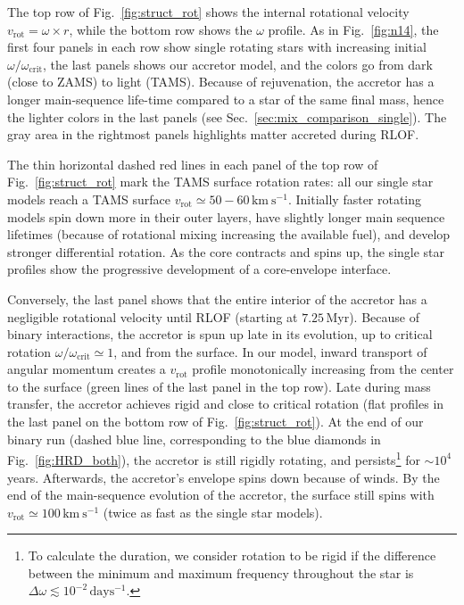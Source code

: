 \documentclass[twocolumn,twocolappendix,trackchanges]{aastex63}
\newcommand{\kms}{{\mathrm{km\ s^{-1}}}}
\DeclareRobustCommand{\Figref}[1]{Fig.~\ref{#1}}
\DeclareRobustCommand{\Secref}[1]{Sec.~\ref{#1}}
\begin{document}
The top row of \Figref{fig:struct_rot} shows the internal rotational
velocity $v_\mathrm{rot}=\omega\times r$, while the bottom row shows
the $\omega$ profile. As in \Figref{fig:n14}, the first four panels in
each row show single rotating stars with increasing initial
$\omega/\omega_\mathrm{crit}$, the last panels shows our accretor
model, and the colors go from dark (close to ZAMS) to light
(TAMS). Because of rejuvenation, the accretor has a longer
main-sequence life-time compared to a star of the same final mass,
hence the lighter colors in the last panels (see
\Secref{sec:mix_comparison_single}). The gray area in the rightmost
panels highlights matter accreted during RLOF.

The thin horizontal dashed red lines in each panel of the top row of
\Figref{fig:struct_rot} mark the TAMS surface rotation rates: all our
single star models reach a TAMS surface
$v_\mathrm{rot}\simeq50-60\,\kms$. Initially faster rotating models
spin down more in their outer layers, have slightly longer main
sequence lifetimes (because of rotational mixing increasing the
available fuel), and develop stronger differential rotation. As the
core contracts and spins up, the single star profiles show the
progressive development of a core-envelope interface.

Conversely, the last panel shows that the entire interior of the
accretor has a negligible rotational velocity until RLOF (starting at
$7.25$\,Myr). Because of binary interactions, the accretor is spun up
late in its evolution, up to critical rotation
$\omega/\omega_\mathrm{crit}\simeq1$, and from the surface. In our
model, inward transport of angular momentum creates a $v_\mathrm{rot}$
profile monotonically increasing from the center to the surface (green
lines of the last panel in the top row). Late during mass transfer,
the accretor achieves rigid and close to critical rotation (flat
profiles in the last panel on the bottom row of
\Figref{fig:struct_rot}). At the end of our binary run (dashed blue
line, corresponding to the blue diamonds in \Figref{fig:HRD_both}),
the accretor is still rigidly rotating, and persists\footnote{To
  calculate the duration, we consider rotation to be rigid
  if the difference between the minimum and maximum
  frequency throughout the star is $\Delta \omega \lesssim 10^{-2}\,\mathrm{days^{-1}}$.} for
$\sim10^{4}$\,years. Afterwards, the accretor's envelope spins down
because of winds. By the end of the main-sequence evolution of the
accretor, the surface still spins with $v_\mathrm{rot}\simeq100\,\kms$
(twice as fast as the single star models).
\end{document}
